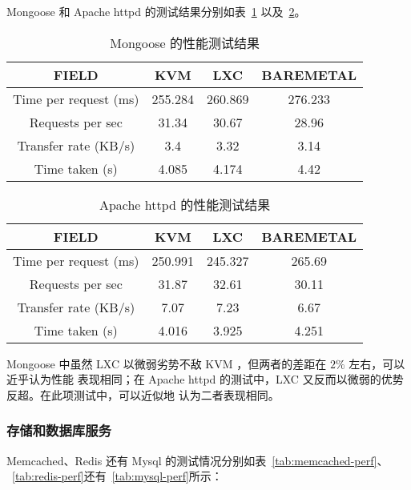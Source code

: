 Mongoose 和 Apache httpd 的测试结果分别如表~\ref{tab:mongoose-perf}
以及~\ref{tab:apache-perf}。

\begin{table}[H]
    \centering
    \caption{Mongoose 的性能测试结果}
    \begin{tabular}{||c c c c||}
        \hline
        FIELD & KVM & LXC & BAREMETAL \\
        \hline
        \hline
        Time per request (ms) & 255.284 & 260.869 & 276.233 \\
        \hline
        Requests per sec & 31.34 & 30.67 & 28.96 \\
        \hline
        Transfer rate (KB/s) & 3.4 & 3.32 & 3.14 \\
        \hline
        Time taken (s) & 4.085 & 4.174 & 4.42 \\
        \hline
    \end{tabular}
    \label{tab:mongoose-perf}
\end{table}

\begin{table}[H]
    \centering
    \caption{Apache httpd 的性能测试结果}
    \begin{tabular}{||c c c c||}
        \hline
        FIELD & KVM & LXC & BAREMETAL \\
        \hline
        \hline
        Time per request (ms) & 250.991 & 245.327 & 265.69 \\
        \hline
        Requests per sec & 31.87 & 32.61 & 30.11 \\
        \hline
        Transfer rate (KB/s) & 7.07 & 7.23 & 6.67 \\
        \hline
        Time taken (s) & 4.016 & 3.925 & 4.251 \\
        \hline
    \end{tabular}
    \label{tab:apache-perf}
\end{table}

Mongoose 中虽然 LXC 以微弱劣势不敌 KVM ，但两者的差距在 $2\%$ 左右，可以近乎认为性能
表现相同；在 Apache httpd 的测试中，LXC 又反而以微弱的优势反超。在此项测试中，可以近似地
认为二者表现相同。

\subsubsection{存储和数据库服务}

Memcached、Redis 还有 Mysql 的测试情况分别如表~\ref{tab:memcached-perf}、
~\ref{tab:redis-perf}还有~\ref{tab:mysql-perf}所示：

